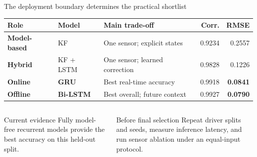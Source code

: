 \documentclass[aspectratio=169,11pt]{beamer}
\newcommand{\best}[1]{\textbf{#1}}
\begin{document}
\begin{frame}{The deployment boundary determines the practical shortlist}
  \small
  \setlength{\tabcolsep}{5pt}
  \renewcommand{\arraystretch}{1.2}
  \begin{tabularx}{\textwidth}{@{}>{\bfseries}p{2.4cm}p{3.3cm}Yrr@{}}
    \toprule
    Role & Model & Main trade-off & Corr. & RMSE\\
    \midrule
    Model-based & KF & One sensor; explicit states & 0.9234 & 0.2557\\
    Hybrid & KF + LSTM & One sensor; learned correction & 0.9828 & 0.1226\\
    Online & \best{GRU} & Best real-time accuracy & 0.9918 & \best{0.0841}\\
    Offline & \best{Bi-LSTM} & Best overall; future context & 0.9927 & \best{0.0790}\\
    \bottomrule
  \end{tabularx}

  \vspace{0.45cm}
  \begin{columns}[T,onlytextwidth]
    \begin{column}{0.48\textwidth}
      \begin{block}{Current evidence}
        Fully model-free recurrent models provide the best accuracy on this held-out split.
      \end{block}
    \end{column}
    \begin{column}{0.48\textwidth}
      \begin{alertblock}{Before final selection}
        Repeat driver splits and seeds, measure inference latency, and run sensor ablation under an equal-input protocol.
      \end{alertblock}
    \end{column}
  \end{columns}
\end{frame}
\end{document}
